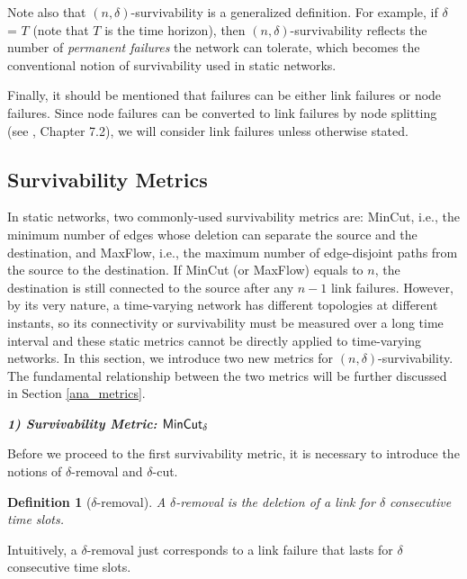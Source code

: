 \documentclass[10pt, conference, letterpaper]{IEEEtran}
\newtheorem{definition}{Definition}
\begin{document}
Note also that $(n,\delta)$-survivability is a generalized definition. For example, if $\delta$ = $T$ (note that $T$ is the time horizon), then $(n,\delta)$-survivability reflects the number of \emph{permanent failures} the network can tolerate, which becomes the conventional notion of survivability used in static networks.


Finally, it should be mentioned that failures can be either link failures or node failures. Since node failures can be converted to link failures by node splitting (see \cite{LP}, Chapter 7.2), we will consider link failures unless otherwise stated.
\subsection{Survivability Metrics}\label{intro_metrics}
In static networks, two commonly-used survivability metrics are: MinCut, i.e., the minimum number of edges whose deletion can separate the source and the destination, and MaxFlow, i.e., the maximum number of edge-disjoint paths from the source to the destination.  If MinCut (or MaxFlow) equals to $n$, the destination is still connected to the source after any $n-1$ link failures. However, by its very nature, a time-varying network has different topologies at different instants, so its connectivity or survivability must be measured over a long time interval and these static metrics cannot be directly applied to time-varying networks. In this section, we introduce two new metrics for $(n,\delta)$-survivability. The fundamental relationship between the two metrics will be further discussed in Section \ref{ana_metrics}.

\vspace{1mm}

\noindent \emph{\textbf{1) Survivability Metric: $\mathlarger{\mathsf{MinCut_{\delta}}}$}}

\vspace{1mm}

Before we proceed to the first survivability metric, it is necessary to introduce the notions of $\delta$-removal and $\delta$-cut.
\begin{definition}[{$\delta$-removal}]
A $\delta$-removal is the deletion of a link for $\delta$ consecutive time slots.
\end{definition}

\noindent Intuitively, a $\delta$-removal just corresponds to a link failure that lasts for $\delta$ consecutive time slots. 
\end{document}

